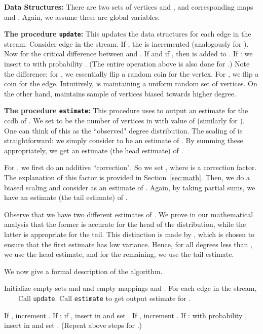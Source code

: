 \documentclass[11pt]{article}
\theoremstyle{definition}
\newcommand{\degdist}{{\tt headtail}}
\newcommand{\update}{{\tt update}}
\newcommand{\est}{{\tt estimate}}
\begin{document}
{\bf Data Structures:} There are two sets of vertices  and ,
and corresponding maps  and .
Again, we assume these are global variables.

{\bf The procedure \update:} This updates the data structures for each edge in the stream.
Consider edge  in the stream.
If , the  is incremented (analogously for ). Now for the critical
difference between  and . If  and if ,
then  is added to . If : we insert  to  with probability .
(The entire operation above is also done for .)
Note the difference: for , we essentially flip a random coin for the vertex. For , we flip a coin for the edge.
Intuitively,  is maintaining a uniform random set of vertices. On the other hand,
 maintains sample of vertices biased towards higher degree.

{\bf The procedure \est:} This procedure uses  to output
an estimate  for the ccdh of . We set  to be the number
of vertices in  with  value of  (similarly for ).
One can think of this as the ``observed" degree distribution. The scaling of
 is straightforward: we simply consider  to be an estimate
of .  By summing these appropriately, we get an estimate (the head
estimate) of .


For , we first do an additive ``correction". So we set ,
where  is a correction factor. The explanation of this factor is
provided in Section~\ref{sec:math}.
Then, we do a biased scaling and consider  as an estimate of .
Again, by taking partial sums, we have an estimate (the tail estimate) of .

Observe that we have two different estimates of . We prove in our mathematical analysis
that the former is accurate for the head of the distribution, while the latter is appropriate
for the tail. This distinction is made by , which is chosen to ensure
that the first estimate has low variance. Hence, for all degrees less than , we
use the head estimate, and for the remaining, we use the tail estimate.

\medskip
We now give a formal description of the algorithm.



\begin{algorithm}
\caption{\degdist} \label{alg:degdist}
\DontPrintSemicolon
Initialize empty sets  and  and empty mappings  and .\;
For each edge  in the stream,\;
\ \ \ \ Call \update.\;
Call \est{} to get output estimate for .\;
\end{algorithm}

\begin{algorithm}
\caption{\update} \label{alg:update}
\DontPrintSemicolon
If , increment .\;
If : if , insert  in  and set .\;
If , increment .\;
If : with probability , insert  in  and set .\;
(Repeat above steps for .)
\end{algorithm}
\end{document}
